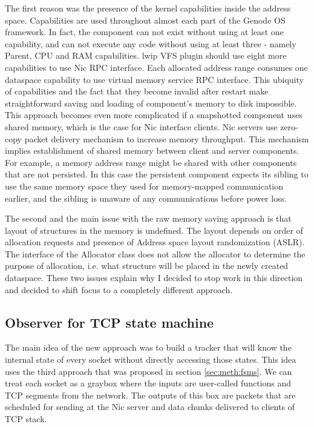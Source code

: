The first reason was the presence of the kernel capabilities inside the address
space. Capabilities are used throughout almost each part of the Genode OS
framework. In fact, the component can not exist without using at least one
capability, and can not execute any code without using at least three - namely
Parent, CPU and RAM capabilities. lwip VFS plugin should use eight more
capabilities to use Nic RPC interface. Each allocated address range consumes
one dataspace capability to use virtual memory service RPC interface. This
ubiquity of capabilities and the fact that they become invalid after restart
make straightforward saving and loading of component's memory to disk
impossible. This approach becomes even more complicated if a snapshotted
component uses shared memory, which is the case for Nic interface clients. Nic
servers use zero-copy packet delivery mechanism to increase memory throughput.
This mechanism implies establishment of shared memory between client and server
components. For example, a memory address range might be shared with other
components that are not persisted. In this case the persistent component
expects its sibling to use the same memory space they used for memory-mapped
communication earlier, and the sibling is unaware of any communications before
power loss.

The second and the main issue with the raw memory saving approach is that
layout of structures in the memory is undefined. The layout depends on order
of allocation requests and presence of Address space layout randomization
(ASLR). The interface of the Allocator class does not allow the allocator to
determine the purpose of allocation, i.e. what structure will be placed in the
newly created dataspace. These two issues explain why I decided to stop work in
this direction and decided to shift focus to a completely different approach.

\subsection{Observer for TCP state machine}

The main idea of the new approach was to build a tracker that will know the
internal state of every socket without directly accessing those states. This
idea uses the third approach that was proposed in section \ref{sec:meth:fsms}. 
We can treat each socket as a graybox where the inputs are user-called
functions and TCP segments from the network. The outputs of this box are packets
that are scheduled for sending at the Nic server and data chunks delivered to
clients of TCP stack.

